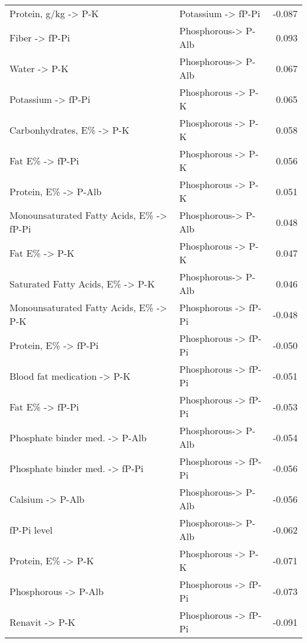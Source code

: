 \documentclass[border=1mm, preview]{standalone}
\begin{document}
\begin{table}[H]
\begin{tabular}[t]{llr}
\addlinespace
Protein, g/kg -> P-K & Potassium -> fP-Pi & -0.087\\
Fiber -> fP-Pi & Phosphorous-> P-Alb & 0.093\\
Water -> P-K & Phosphorous-> P-Alb & 0.067\\
Potassium -> fP-Pi & Phosphorous -> P-K & 0.065\\
Carbonhydrates, E\% -> P-K & Phosphorous -> P-K & 0.058\\
\addlinespace
Fat E\% -> fP-Pi & Phosphorous -> P-K & 0.056\\
Protein, E\% -> P-Alb & Phosphorous -> P-K & 0.051\\
Monounsaturated Fatty Acids, E\% -> fP-Pi & Phosphorous-> P-Alb & 0.048\\
Fat E\% -> P-K & Phosphorous -> P-K & 0.047\\
Saturated Fatty Acids, E\% -> P-K & Phosphorous-> P-Alb & 0.046\\
\addlinespace
Monounsaturated Fatty Acids, E\% -> P-K & Phosphorous -> fP-Pi & -0.048\\
Protein, E\% -> fP-Pi & Phosphorous -> fP-Pi & -0.050\\
Blood fat medication -> P-K & Phosphorous -> fP-Pi & -0.051\\
Fat E\% -> fP-Pi & Phosphorous -> fP-Pi & -0.053\\
Phosphate binder med. -> P-Alb & Phosphorous-> P-Alb & -0.054\\
\addlinespace
Phosphate binder med. -> fP-Pi & Phosphorous -> fP-Pi & -0.056\\
Calsium -> P-Alb & Phosphorous-> P-Alb & -0.056\\
fP-Pi level & Phosphorous-> P-Alb & -0.062\\
Protein, E\% -> P-K & Phosphorous -> P-K & -0.071\\
Phosphorous -> P-Alb & Phosphorous -> fP-Pi & -0.073\\
\addlinespace
Renavit -> P-K & Phosphorous -> fP-Pi & -0.091\\
\bottomrule
\end{tabular}
\end{table}
\end{document}
